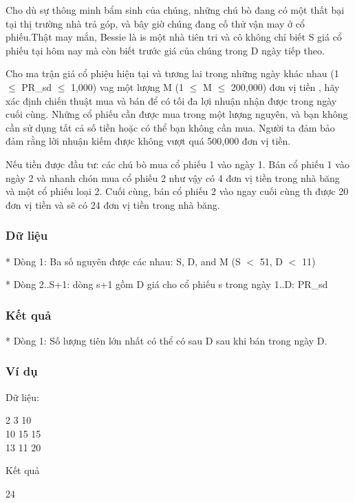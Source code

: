



   Cho dù sự thông minh bẩm sinh của chúng, những chú bò đang có một thất  bại tại thị trường nhà trả góp, và bây giờ chúng đang cố thử vận may ở  cổ phiếu.Thật may mắn, Bessie là is một nhà tiên tri và cô không chỉ biết  S giá cổ phiếu tại hôm nay mà còn biết trước giá của chúng trong D ngày  tiếp theo.  

   Cho ma trận giá cổ phiệu hiện tại và tương lai trong những ngày khác nhau  (1  $\le$  PR\_sd  $\le$  1,000) vag một lượng M (1  $\le$  M  $\le$  200,000) đơn vị tiền , hãy xác định chiến thuật mua và bán để có tối đa lợi nhuận nhận được trong  ngày cuối cùng. Những cổ phiếu cần được mua trong một lượng nguyên, và bạn  không cần sử dụng tất cả số tiền hoặc có thể bạn không cần mua. Người ta  đảm bảo đảm rằng lời nhuận kiếm được không vượt quá 500,000 đơn vị tiền.  

   Nếu tiền được đầu tư: các chú bò mua cổ phiếu 1 vào ngày 1. Bán cổ phiếu  1 vào ngày 2 và nhanh chón mua cổ phiếu 2 như vậy có 4 đơn vị tiền trong  nhà băng và một cổ phiếu loại 2. Cuối cùng, bán cổ phiếu 2 vào ngay cuối  cùng th được 20 đơn vị tiền và sẽ có 24 đơn vị tiền trong nhà băng.  

\subsubsection{   Dữ liệu  }

   * Dòng 1: Ba số nguyên được các nhau: S, D, and M (S $<$ 51, D $<$ 11)  

   * Dòng 2..S+1: dòng s+1 gồm D giá cho cổ phiếu s trong ngày 1..D: PR\_sd  

\subsubsection{   Kết quả  }

   * Dòng 1: Số lượng tiên lớn nhất có thể có sau D sau khi bán trong ngày D.  

\subsubsection{   Ví dụ  }

   Dữ liệu:  

   2 3 10   
\\   10 15 15   
\\   13 11 20  



   Kết quả  

   24  

